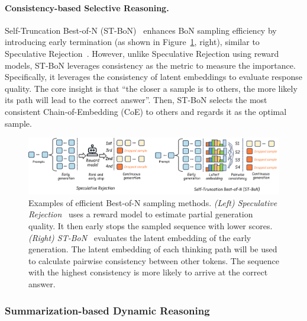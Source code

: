 \paragraph{Consistency-based Selective Reasoning.} Self-Truncation Best-of-N (ST-BoN)~\cite{wang2025sampling} enhances BoN sampling efficiency by introducing early termination (as shown in Figure~\ref{fig:bonsample}, right), similar to Speculative Rejection~\cite{sun2024fast}. However, unlike Speculative Rejection using reward models, ST-BoN leverages consistency as the metric to measure the importance. Specifically, it leverages the consistency of latent embeddings to evaluate response quality. The core insight is that ``the closer a sample is to others, the more likely its path will lead to the correct answer''. Then, ST-BoN selects the most consistent Chain-of-Embedding (CoE) to others and regards it as the optimal sample.

\begin{figure}[t]
    \centering
    \includegraphics[width=\linewidth]{figs/testtimecompute.pdf}
    \caption{Examples of efficient Best-of-N sampling methods. \textit{(Left) Speculative Rejection}~\cite{sun2024fast} uses a reward model to estimate partial generation quality. It then early stops the sampled sequence with lower scores. \textit{(Right) ST-BoN}~\cite{wang2025sampling} evaluates the latent embedding of the early generation. The latent embedding of each thinking path will be used to calculate pairwise consistency between other tokens. The sequence with the highest consistency is more likely to arrive at the correct answer.}
    \label{fig:bonsample}
\end{figure}

\subsubsection{Summarization-based Dynamic Reasoning}

